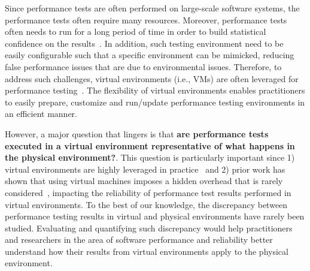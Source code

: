 

Since performance tests are often performed on large-scale software systems, the performance tests often require many resources. Moreover, performance tests often needs to run for a long period of time in order to build statistical confidence on the results~\cite{ranjanbook}. In addition, such testing environment need to be easily configurable such that a specific environment can be mimicked, reducing false performance issues that are due to environmental issues. Therefore, to address such challenges, virtual environments (i.e., VMs) are often leveraged for performance testing~\cite{whyvirtualisbetter, vmwarehighcost}. The flexibility of virtual environments enables practitioners to easily prepare, customize and run/update performance testing environments in an efficient manner.



However, a major question that lingers is that \textbf{are performance tests executed in a virtual environment representative of what happens in the physical environment?}. This question is particularly important since 1) virtual environments are highly leveraged in practice~\cite{Nguyen:2012:ADP:2188286.2188344,xiong2013vperfguard} and 2) prior work has shown that using virtual machines imposes a hidden overhead that is rarely considered~\cite{menon2005diagnosing}, impacting the reliability of performance test results performed in virtual environments. To the best of our knowledge, the discrepancy between performance testing results in virtual and physical environments have rarely been studied. Evaluating and quantifying such discrepancy would help practitioners and researchers in the area of software performance and reliability better understand how their results from virtual environments apply to the physical environment.


